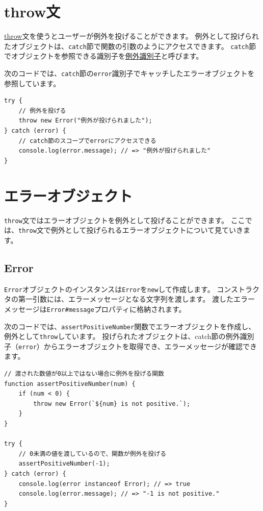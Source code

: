 \hypertarget{throw}{%
\section{throw文}\label{throw}}

\href{https://developer.mozilla.org/ja/docs/Web/JavaScript/Reference/Statements/throw}{throw}文を使うとユーザーが例外を投げることができます。
例外として投げられたオブジェクトは、\texttt{catch}節で関数の引数のようにアクセスできます。
\texttt{catch}節でオブジェクトを参照できる識別子を\href{https://developer.mozilla.org/ja/docs/Web/JavaScript/Reference/Statements/try...catch\#The_exception_identifier}{例外識別子}と呼びます。

次のコードでは、\texttt{catch}節の\texttt{error}識別子でキャッチしたエラーオブジェクトを参照しています。

\begin{lstlisting}
try {
    // 例外を投げる
    throw new Error("例外が投げられました");
} catch (error) {
    // catch節のスコープでerrorにアクセスできる
    console.log(error.message); // => "例外が投げられました"
}
\end{lstlisting}

\hypertarget{error-object}{%
\section{エラーオブジェクト}\label{error-object}}

\texttt{throw}文ではエラーオブジェクトを例外として投げることができます。
ここでは、\texttt{throw}文で例外として投げられるエラーオブジェクトについて見ていきます。

\hypertarget{error}{%
\subsection{Error}\label{error}}

\texttt{Error}オブジェクトのインスタンスは\texttt{Error}を\texttt{new}して作成します。
コンストラクタの第一引数には、エラーメッセージとなる文字列を渡します。
渡したエラーメッセージは\texttt{Error\#message}プロパティに格納されます。

次のコードでは、\texttt{assertPositiveNumber}関数でエラーオブジェクトを作成し、例外として\texttt{throw}しています。
投げられたオブジェクトは、catch節の例外識別子（\texttt{error}）からエラーオブジェクトを取得でき、エラーメッセージが確認できます。

\begin{lstlisting}
// 渡された数値が0以上ではない場合に例外を投げる関数
function assertPositiveNumber(num) {
    if (num < 0) {
        throw new Error(`${num} is not positive.`);
    }
}

try {
    // 0未満の値を渡しているので、関数が例外を投げる
    assertPositiveNumber(-1);
} catch (error) {
    console.log(error instanceof Error); // => true
    console.log(error.message); // => "-1 is not positive."
}
\end{lstlisting}

